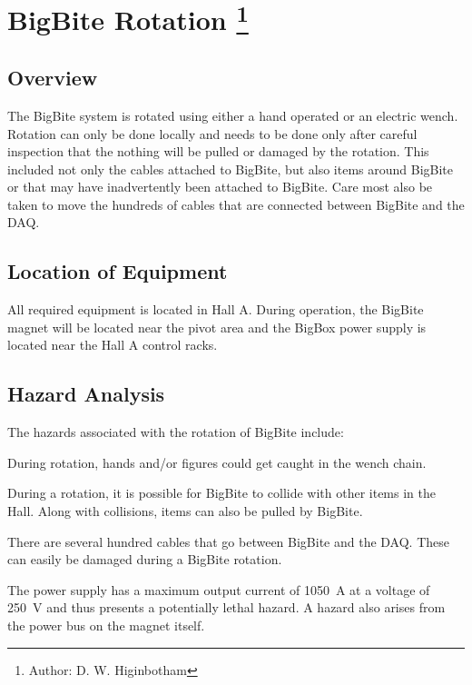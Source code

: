 %
%

\chapter[BigBite Rotation]{BigBite Rotation 
\footnote{Author: D. W. Higinbotham }
}

\section{Overview}
The BigBite system is rotated using either a hand operated or an electric wench.
Rotation can only be done locally and needs to be done only after careful inspection that
the nothing will be pulled or damaged by the rotation.  This included not only the cables
attached to BigBite, but also items around BigBite or that may have inadvertently been attached 
to BigBite.  Care most also be taken to move the hundreds of cables that are connected between BigBite
and the DAQ.

\section{Location of Equipment}

All required equipment is located in Hall A.  During operation, the BigBite magnet 
will be located near the pivot area and the BigBox power supply is
located near the Hall A control racks.

\section{Hazard Analysis}

The hazards associated with the rotation of BigBite include:

During rotation, hands and/or figures could get caught in the wench chain. 

During a rotation, it is possible for BigBite to collide with other items in the Hall.
Along with collisions, items can also be pulled by BigBite.

There are several hundred cables that go between BigBite and the DAQ.  These can easily
be damaged during a BigBite rotation.

	The power supply has a maximum output current of 1050~A 
at a voltage of 250~V and thus presents a potentially lethal hazard.  
A hazard also arises from the power bus on the magnet itself. 

